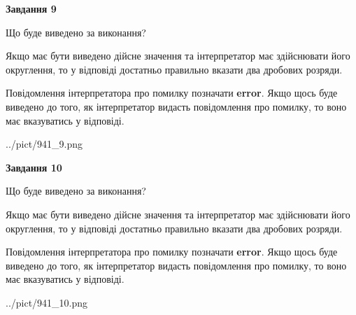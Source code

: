 \documentclass[12pt, ukrainian]{article}
\begin{document}
{\begin {Large}
{\begin {center}\textbf{Завдання 9}\end {center}}\par
Що буде виведено за виконання? \par

Якщо має бути виведено дійсне значення та інтерпретатор має здійснювати його округлення, 
то у відповіді достатньо правильно вказати два дробових розряди.

Повідомлення інтерпретатора про помилку позначати \textbf{error}.
Якщо щось буде виведено до того, як інтерпретатор видасть повідомлення про помилку, 
то воно має вказуватись у відповіді. \par

\begin{center}
	{../pict/941_9.png}
\end{center}
\newpage

{\begin {center}\textbf{Завдання 10}\end {center}}\par
Що буде виведено за виконання? \par

Якщо має бути виведено дійсне значення та інтерпретатор має здійснювати його округлення, 
то у відповіді достатньо правильно вказати два дробових розряди.

Повідомлення інтерпретатора про помилку позначати \textbf{error}.
Якщо щось буде виведено до того, як інтерпретатор видасть повідомлення про помилку, 
то воно має вказуватись у відповіді. \par

\begin{center}
	{../pict/941_10.png}
\end{center}
\newpage

\end {Large}}
\end{document}
